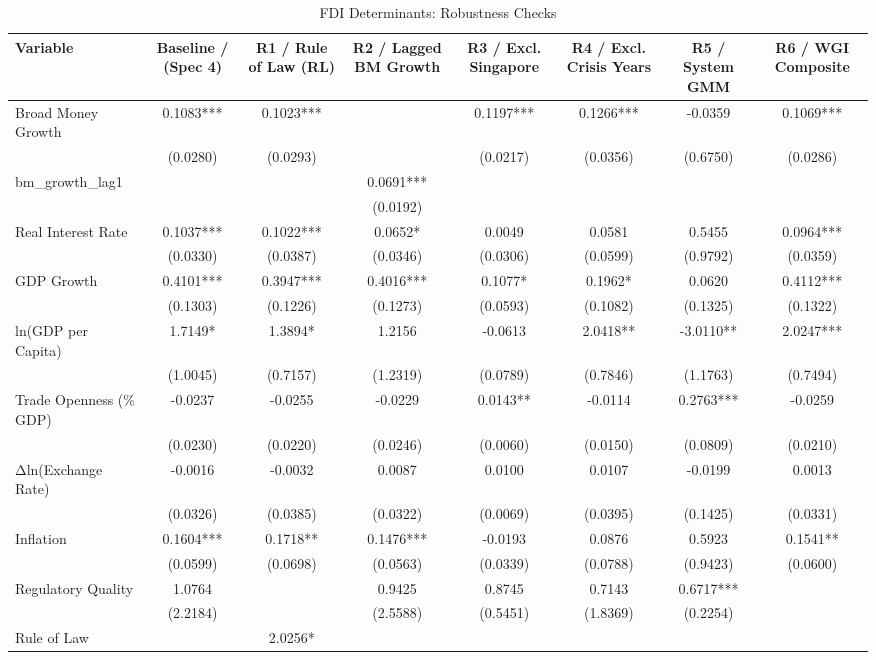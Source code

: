 \begin{table}[htbp]
\centering
\caption{FDI Determinants: Robustness Checks}
\label{tab:robustness}
\begin{tabular}{lccccccc}
\hline\hline
Variable & Baseline / (Spec 4) & R1 / Rule of Law (RL) & R2 / Lagged BM Growth & R3 / Excl. Singapore & R4 / Excl. Crisis Years & R5 / System GMM & R6 / WGI Composite \\
\hline
Broad Money Growth & 0.1083*** & 0.1023*** &  & 0.1197*** & 0.1266*** & -0.0359 & 0.1069*** \\
 & (0.0280) & (0.0293) &  & (0.0217) & (0.0356) & (0.6750) & (0.0286) \\
bm\_growth\_lag1 &  &  & 0.0691*** &  &  &  &  \\
 &  &  & (0.0192) &  &  &  &  \\
Real Interest Rate & 0.1037*** & 0.1022*** & 0.0652* & 0.0049 & 0.0581 & 0.5455 & 0.0964*** \\
 & (0.0330) & (0.0387) & (0.0346) & (0.0306) & (0.0599) & (0.9792) & (0.0359) \\
GDP Growth & 0.4101*** & 0.3947*** & 0.4016*** & 0.1077* & 0.1962* & 0.0620 & 0.4112*** \\
 & (0.1303) & (0.1226) & (0.1273) & (0.0593) & (0.1082) & (0.1325) & (0.1322) \\
ln(GDP per Capita) & 1.7149* & 1.3894* & 1.2156 & -0.0613 & 2.0418** & -3.0110** & 2.0247*** \\
 & (1.0045) & (0.7157) & (1.2319) & (0.0789) & (0.7846) & (1.1763) & (0.7494) \\
Trade Openness (\% GDP) & -0.0237 & -0.0255 & -0.0229 & 0.0143** & -0.0114 & 0.2763*** & -0.0259 \\
 & (0.0230) & (0.0220) & (0.0246) & (0.0060) & (0.0150) & (0.0809) & (0.0210) \\
Δln(Exchange Rate) & -0.0016 & -0.0032 & 0.0087 & 0.0100 & 0.0107 & -0.0199 & 0.0013 \\
 & (0.0326) & (0.0385) & (0.0322) & (0.0069) & (0.0395) & (0.1425) & (0.0331) \\
Inflation & 0.1604*** & 0.1718** & 0.1476*** & -0.0193 & 0.0876 & 0.5923 & 0.1541** \\
 & (0.0599) & (0.0698) & (0.0563) & (0.0339) & (0.0788) & (0.9423) & (0.0600) \\
Regulatory Quality & 1.0764 &  & 0.9425 & 0.8745 & 0.7143 & 0.6717*** &  \\
 & (2.2184) &  & (2.5588) & (0.5451) & (1.8369) & (0.2254) &  \\
Rule of Law &  & 2.0256* &  &  &  &  &  \\

\end{tabular}
\end{table}
